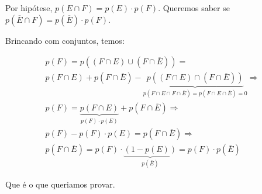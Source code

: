 \item
Por hipótese, $p(E \cap F) = p(E) \cdot p(F)$. Queremos saber se
$p(\overline{E} \cap F) = p(\overline{E}) \cdot p(F)$.

Brincando com conjuntos, temos:

\[\begin{array}{l}
p(F) = p\left( {\left( {F \cap E} \right) \cup \left( {F \cap \overline E } \right)} \right) = \\
p\left( {F \cap E} \right) + p\left( {F \cap \overline E } \right) - \underbrace {p\left( {\left( {F \cap E} \right) \cap \left( {F \cap \overline E } \right)} \right)}_{p\left( {F \cap E \cap F \cap \overline E } \right) = p\left( {F \cap E \cap \overline E } \right) = 0} \Rightarrow \\
p(F) = \underbrace {p\left( {F \cap E} \right)}_{p(F) \cdot p(E)} + p\left( {F \cap \overline E } \right) \Rightarrow \\
p(F) - p(F) \cdot p(E) = p\left( {F \cap \overline E } \right) \Rightarrow \\
p\left( {F \cap \overline E } \right) = p(F) \cdot \underbrace {\left( {1 - p(E)} \right)}_{p\left( {\bar E} \right)} = p(F) \cdot p\left( {\bar E} \right)
\end{array}\]

Que é o que queriamos provar.

